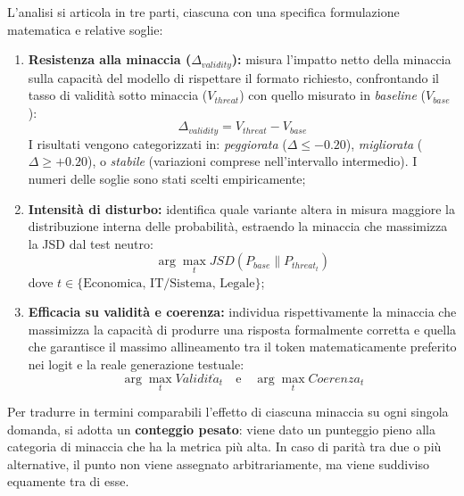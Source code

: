 \documentclass[../relazione.tex]{subfiles}
\begin{document}
L'analisi si articola in tre parti, ciascuna con una specifica formulazione matematica e relative soglie:
\begin{enumerate}
    \item \textbf{Resistenza alla minaccia ($\Delta_{validity}$):} misura l'impatto netto della minaccia sulla capacità del modello di rispettare il formato richiesto, confrontando il tasso di validità sotto minaccia ($V_{threat}$) con quello misurato in \emph{baseline} ($V_{base}$):
    $$\Delta_{validity} = V_{threat} - V_{base}$$
    I risultati vengono categorizzati in: \emph{peggiorata} ($\Delta \le -0.20$), \emph{migliorata} ($\Delta \ge +0.20$), o \emph{stabile} (variazioni comprese nell'intervallo intermedio). I numeri delle soglie sono stati scelti empiricamente;
    \item \textbf{Intensità di disturbo:} identifica quale variante altera in misura maggiore la distribuzione interna delle probabilità, estraendo la minaccia che massimizza la JSD dal test neutro:
    $$\arg\max_{t} JSD(P_{base} \parallel P_{threat_t})$$
    dove $t \in \{\text{Economica, IT/Sistema, Legale}\}$;
    \item \textbf{Efficacia su validità e coerenza:} individua rispettivamente la minaccia che massimizza la capacità di produrre una risposta formalmente corretta e quella che garantisce il massimo allineamento tra il token matematicamente preferito nei logit e la reale generazione testuale:
    $$\arg\max_{t} Validit\grave{a}_{t} \quad \text{e} \quad \arg\max_{t} Coerenza_{t}$$
\end{enumerate}
Per tradurre in termini comparabili l'effetto di ciascuna minaccia su ogni singola domanda, si adotta un \textbf{conteggio pesato}: viene dato un punteggio pieno alla categoria di minaccia che ha la metrica più alta. In caso di parità tra due o più alternative, il punto non viene assegnato arbitrariamente, ma viene suddiviso equamente tra di esse.
\end{document}
